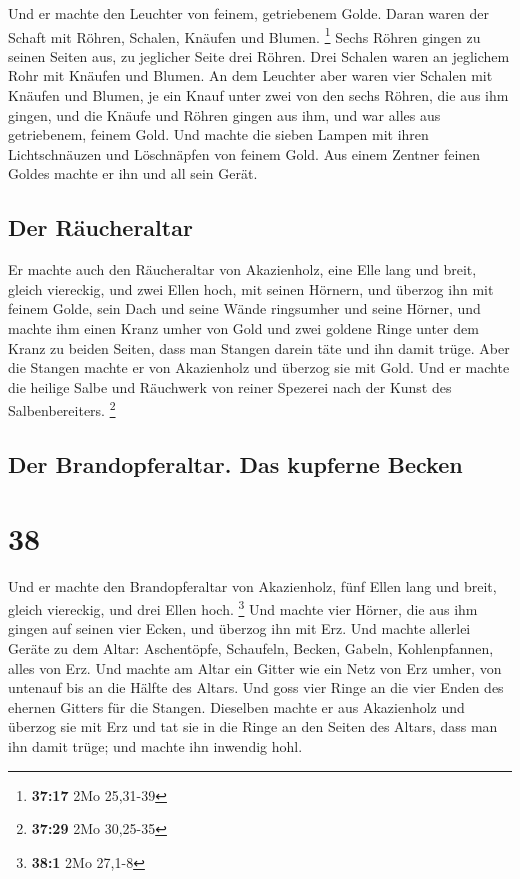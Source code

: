  Und er machte den Leuchter von feinem, getriebenem
Golde. Daran waren der Schaft mit Röhren, Schalen, Knäufen und Blumen.
\footnote{\textbf{37:17} 2Mo 25,31-39}  Sechs Röhren
gingen zu seinen Seiten aus, zu jeglicher Seite drei Röhren.
 Drei Schalen waren an jeglichem Rohr mit Knäufen und
Blumen.  An dem Leuchter aber waren vier Schalen mit
Knäufen und Blumen,  je ein Knauf unter zwei von den
sechs Röhren, die aus ihm gingen,  und die Knäufe und
Röhren gingen aus ihm, und war alles aus getriebenem, feinem Gold.
 Und machte die sieben Lampen mit ihren Lichtschnäuzen
und Löschnäpfen von feinem Gold.  Aus einem Zentner
feinen Goldes machte er ihn und all sein Gerät.

\hypertarget{der-ruxe4ucheraltar}{%
\subsection{Der Räucheraltar}\label{der-ruxe4ucheraltar}}

 Er machte auch den Räucheraltar von Akazienholz, eine
Elle lang und breit, gleich viereckig, und zwei Ellen hoch, mit seinen
Hörnern,  und überzog ihn mit feinem Golde, sein Dach und
seine Wände ringsumher und seine Hörner, und machte ihm einen Kranz
umher von Gold  und zwei goldene Ringe unter dem Kranz zu
beiden Seiten, dass man Stangen darein täte und ihn damit trüge.
 Aber die Stangen machte er von Akazienholz und überzog
sie mit Gold.  Und er machte die heilige Salbe und
Räuchwerk von reiner Spezerei nach der Kunst des Salbenbereiters.
\footnote{\textbf{37:29} 2Mo 30,25-35}

\hypertarget{der-brandopferaltar.-das-kupferne-becken}{%
\subsection{Der Brandopferaltar. Das kupferne
Becken}\label{der-brandopferaltar.-das-kupferne-becken}}

\hypertarget{section-37}{%
\section{38}\label{section-37}}

 Und er machte den Brandopferaltar von Akazienholz, fünf
Ellen lang und breit, gleich viereckig, und drei Ellen hoch. \footnote{\textbf{38:1}
  2Mo 27,1-8}  Und machte vier Hörner, die aus ihm gingen
auf seinen vier Ecken, und überzog ihn mit Erz.  Und
machte allerlei Geräte zu dem Altar: Aschentöpfe, Schaufeln, Becken,
Gabeln, Kohlenpfannen, alles von Erz.  Und machte am Altar
ein Gitter wie ein Netz von Erz umher, von untenauf bis an die Hälfte
des Altars.  Und goss vier Ringe an die vier Enden des
ehernen Gitters für die Stangen.  Dieselben machte er aus
Akazienholz und überzog sie mit Erz  und tat sie in die
Ringe an den Seiten des Altars, dass man ihn damit trüge; und machte ihn
inwendig hohl.

